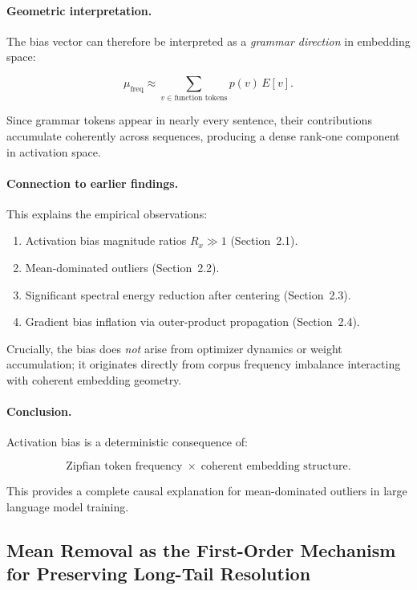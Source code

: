 \paragraph{Geometric interpretation.}

The bias vector can therefore be interpreted as a
\emph{grammar direction} in embedding space:

\[
\mu_{\text{freq}} \approx
\sum_{v \in \text{function tokens}} p(v)\, E[v].
\]

Since grammar tokens appear in nearly every sentence,
their contributions accumulate coherently across sequences,
producing a dense rank-one component in activation space.

\paragraph{Connection to earlier findings.}

This explains the empirical observations:

\begin{enumerate}
\item Activation bias magnitude ratios $R_x \gg 1$ (Section~2.1).
\item Mean-dominated outliers (Section~2.2).
\item Significant spectral energy reduction after centering (Section~2.3).
\item Gradient bias inflation via outer-product propagation (Section~2.4).
\end{enumerate}

Crucially, the bias does \emph{not} arise from
optimizer dynamics or weight accumulation;
it originates directly from corpus frequency imbalance
interacting with coherent embedding geometry.

\paragraph{Conclusion.}

Activation bias is a deterministic consequence of:

\[
\text{Zipfian token frequency}
\;\times\;
\text{coherent embedding structure}.
\]

This provides a complete causal explanation for
mean-dominated outliers in large language model training.

\subsection{Mean Removal as the First-Order Mechanism for Preserving Long-Tail Resolution}
\label{sec:mean_first_order_quantization}

